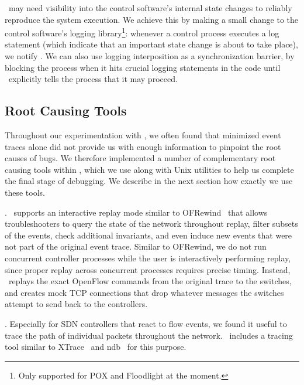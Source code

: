 \projectname~may need visibility into the control software's internal state
changes to reliably reproduce the system execution. We achieve this by
making a
small change to the control software's logging library\footnote{Only supported
for POX and Floodlight at the moment.}: whenever a control process executes a log
statement (which indicate that an important state change is about to take
place), we notify \projectname. We can also use logging interposition as a
synchronization barrier, by blocking the process when it hits crucial logging statements in the code
until \projectname~explicitly tells the process that it may proceed.

\subsection{Root Causing Tools}

Throughout our experimentation with \projectname, we often found that
minimized event traces alone did not provide us with enough information to
pinpoint the root causes of bugs. We therefore implemented a number of
complementary root
causing tools within \projectname,
which we use along with Unix utilities to help us complete the final
stage of debugging. We describe in the next section how exactly we use
these tools.

. \projectname~supports an interactive replay mode
similar to OFRewind~\cite{ofrewind} that allows troubleshooters to query the
state of the network throughout replay, filter subsets of the events, check
additional invariants, and
even induce new events that were not part of the original event trace.
Similar to OFRewind, we do not run concurrent controller processes while the
user is interactively performing replay, since proper replay across
concurrent processes requires precise timing.
Instead, \projectname~replays the exact OpenFlow commands from the
original trace to the switches, and creates mock TCP connections that drop
whatever messages the switches attempt to send back to the controllers.

. Especially for SDN controllers that react to
flow events, we found it useful to trace the path of individual
packets throughout the network. \projectname~includes a tracing tool similar
to XTrace~\cite{fonseca2007x} and ndb~\cite{handigol2012debugger} for this
purpose.

